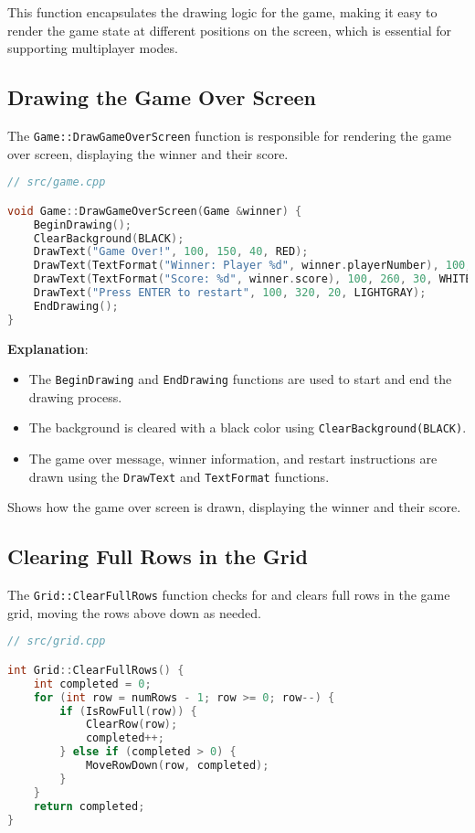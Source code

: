 \documentclass{article}
\begin{document}
This function encapsulates the drawing logic for the game, making it easy to render the game state at different positions on the screen, which is essential for supporting multiplayer modes.

\subsection{Drawing the Game Over Screen}

The \texttt{Game::DrawGameOverScreen} function is responsible for rendering the game over screen, displaying the winner and their score.

\begin{lstlisting}[language=C++]
// src/game.cpp

void Game::DrawGameOverScreen(Game &winner) {
    BeginDrawing();
    ClearBackground(BLACK);
    DrawText("Game Over!", 100, 150, 40, RED);
    DrawText(TextFormat("Winner: Player %d", winner.playerNumber), 100, 220, 30, WHITE);
    DrawText(TextFormat("Score: %d", winner.score), 100, 260, 30, WHITE);
    DrawText("Press ENTER to restart", 100, 320, 20, LIGHTGRAY);
    EndDrawing();
}
\end{lstlisting}

\textbf{Explanation}:

\begin{itemize}
    \item The \texttt{BeginDrawing} and \texttt{EndDrawing} functions are used to start and end the drawing process.
    \item The background is cleared with a black color using \texttt{ClearBackground(BLACK)}.
    \item The game over message, winner information, and restart instructions are drawn using the \texttt{DrawText} and \texttt{TextFormat} functions.
\end{itemize}

Shows how the game over screen is drawn, displaying the winner and their score.

\subsection{Clearing Full Rows in the Grid}

The \texttt{Grid::ClearFullRows} function checks for and clears full rows in the game grid, moving the rows above down as needed.

\begin{lstlisting}[language=C++]
// src/grid.cpp

int Grid::ClearFullRows() {
    int completed = 0;
    for (int row = numRows - 1; row >= 0; row--) {
        if (IsRowFull(row)) {
            ClearRow(row);
            completed++;
        } else if (completed > 0) {
            MoveRowDown(row, completed);
        }
    }
    return completed;
}
\end{lstlisting}
\end{document}
